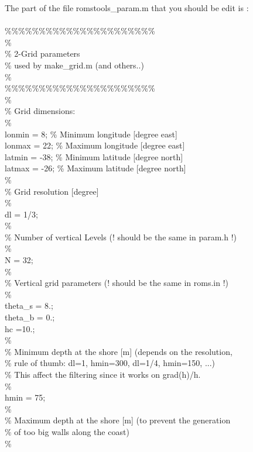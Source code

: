 The part of the file romstools\_param.m that you should be edit is :
\\ \\
\%\%\%\%\%\%\%\%\%\%\%\%\%\%\%\%\%\%\%\%\%\%\\
\%\\
\% 2-Grid parameters\\
\%   used by make\_grid.m (and others..)\\
\%\\
\%\%\%\%\%\%\%\%\%\%\%\%\%\%\%\%\%\%\%\%\%\%\\
\%\\
\% Grid dimensions:\\
\%\\
lonmin =  8;   \% Minimum longitude [degree east]\\
lonmax = 22;   \% Maximum longitude [degree east]\\
latmin = -38;   \% Minimum latitude  [degree north]\\
latmax = -26;   \% Maximum latitude  [degree north]\\
\%\\
\% Grid resolution [degree]\\
\%\\
dl = 1/3;\\
\%\\
\% Number of vertical Levels (! should be the same in param.h !)\\
\%\\
N = 32;\\
\%\\
\%  Vertical grid parameters (! should be the same in roms.in !)\\
\%\\
theta\_s = 8.;\\
theta\_b = 0.;\\
hc      =10.;\\
\%\\
\% Minimum depth at the shore [m] (depends on the resolution,\\
\% rule of thumb: dl=1, hmin=300, dl=1/4, hmin=150, ...)\\
\% This affect the filtering since it works on grad(h)/h.\\
\%\\
hmin = 75;\\
\%\\
\% Maximum depth at the shore [m] (to prevent the generation\\
\% of too big walls along the coast)\\
\%\\
